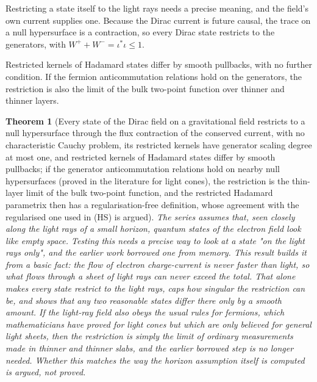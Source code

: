 \documentclass[11pt]{article}
\newtheorem{theorem}{Theorem}[section]
\theoremstyle{definition}
\theoremstyle{plain}
\begin{document}
Restricting a state itself to the light rays needs a precise meaning, and the field's own current supplies one. Because the Dirac current is future causal, the trace on a null hypersurface is a contraction, so every Dirac state restricts to the generators, with $W^{+} + W^{-} = \iota^{*}\iota \le 1$.

Restricted kernels of Hadamard states differ by smooth pullbacks, with no further condition. If the fermion anticommutation relations hold on the generators, the restriction is also the limit of the bulk two-point function over thinner and thinner layers.

\begin{theorem}[Every state of the Dirac field on a gravitational field restricts to a null hypersurface through the flux contraction of the conserved current, with no characteristic Cauchy problem, its restricted kernels have generator scaling degree at most one, and restricted kernels of Hadamard states differ by smooth pullbacks; if the generator anticommutation relations hold on nearby null hypersurfaces (proved in the literature for light cones), the restriction is the thin-layer limit of the bulk two-point function, and the restricted Hadamard parametrix then has a regularisation-free definition, whose agreement with the regularised one used in (HS) is argued]\label{c:synthesis.dirac-states-restrict-to-null-hypersurfaces-through-the-flux-contraction-and-are-thin-layer-limits-under-the-generator-car}
The series assumes that, seen closely along the light rays of a small horizon, quantum states of the electron field look like empty space. Testing this needs a precise way to look at a state "on the light rays only", and the earlier work borrowed one from memory. This result builds it from a basic fact: the flow of electron charge-current is never faster than light, so what flows through a sheet of light rays can never exceed the total. That alone makes every state restrict to the light rays, caps how singular the restriction can be, and shows that any two reasonable states differ there only by a smooth amount. If the light-ray field also obeys the usual rules for fermions, which mathematicians have proved for light cones but which are only believed for general light sheets, then the restriction is simply the limit of ordinary measurements made in thinner and thinner slabs, and the earlier borrowed step is no longer needed. Whether this matches the way the horizon assumption itself is computed is argued, not proved.
\end{theorem}
\end{document}
